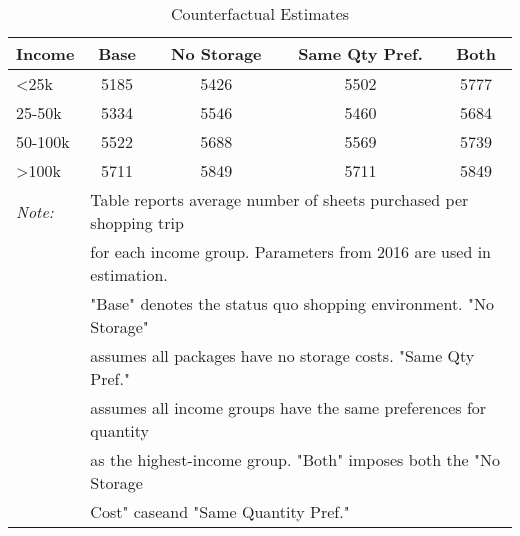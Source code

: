 \begin{table}[!htbp] \centering
\caption{Counterfactual Estimates}
\label{tab:counterfactualMNL}
\begin{tabular}{lcccc}
\hline
Income   & Base   & No Storage  &  Same Qty Pref.  & Both \\
\hline
<25k     & 5185   & 5426              & 5502                  & 5777 \\
25-50k   & 5334   & 5546              & 5460                  & 5684 \\
50-100k  & 5522   & 5688              & 5569                  & 5739 \\
>100k    & 5711   & 5849              & 5711                  & 5849 \\
\hline
\hline
\textit{Note:}  & \multicolumn{4}{l}{\footnotesize{Table reports average number of sheets purchased per shopping trip}} \\
 & \multicolumn{4}{l}{\footnotesize{for each income group. Parameters from 2016 are used in estimation.}} \\
  & \multicolumn{4}{l}{\footnotesize{"Base" denotes the status quo shopping environment. "No Storage"}} \\
 & \multicolumn{4}{l}{\footnotesize{assumes all packages have no storage costs. "Same Qty Pref."}} \\
 & \multicolumn{4}{l}{\footnotesize{assumes all income groups have the same preferences for quantity}} \\
 & \multicolumn{4}{l}{\footnotesize{as the highest-income group. "Both" imposes both the "No Storage}} \\
 & \multicolumn{4}{l}{\footnotesize{Cost" caseand "Same Quantity Pref."}} \\
\end{tabular}
\end{table}
